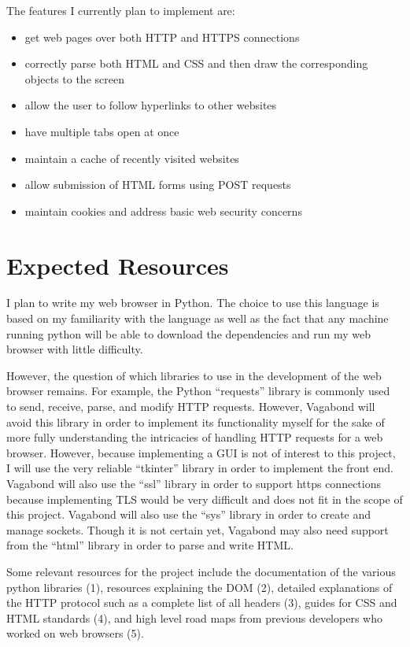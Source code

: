 \documentclass[12pt]{article}
\begin{document}
The features I currently plan to implement are: 
\begin{itemize}
\item get web pages over both HTTP and HTTPS connections
\item correctly parse both HTML and CSS and then draw the corresponding objects to the screen
\item allow the user to follow hyperlinks to other websites
\item have multiple tabs open at once
\item maintain a cache of recently visited websites
\item allow submission of HTML forms using POST requests
\item maintain cookies and address basic web security concerns
\end{itemize}

\section{Expected Resources}

I plan to write my web browser in Python.  The choice to use this language is based on my familiarity with the language as well as the fact that any machine running python will be able to download the dependencies and run my web browser with little difficulty.

However, the question of which libraries to use in the development of the web browser remains.  For example, the Python “requests” library is commonly used to send, receive, parse, and modify HTTP requests.  However, Vagabond will avoid this library in order to implement its functionality myself for the sake of more fully understanding the intricacies of handling HTTP requests for a web browser.  However, because implementing a GUI is not of interest to this project, I will use the very reliable “tkinter” library in order to implement the front end.  Vagabond will also use the “ssl” library in order to support https connections because implementing TLS would be very difficult and does not fit in the scope of this project.  Vagabond will also use the “sys” library in order to create and manage sockets.  Though it is not certain yet, Vagabond may also need support from the “html” library in order to parse and write HTML.

Some relevant resources for the project include the documentation of the various python libraries (1), resources explaining the DOM (2), detailed explanations of the HTTP protocol such as a complete list of all headers (3), guides for CSS and HTML standards (4), and high level road maps from previous developers who worked on web browsers (5).
\end{document}
